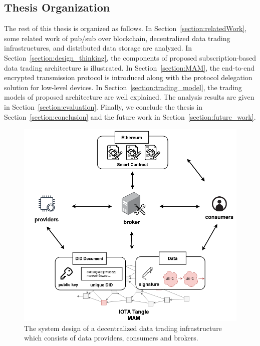 \begin{spacing}{2.0}
\subsection{Thesis Organization}
The rest of this thesis is organized as follows. In Section~\ref{section:relatedWork}, some related work of pub/sub over blockchain, decentralized data trading infrastructures, and distributed data storage are analyzed. In Section~\ref{section:design_thinking}, the components of proposed subscription-based data trading architecture is illustrated. In Section~\ref{section:MAM}, the end-to-end encrypted transmission protocol is introduced along with the protocol delegation solution for low-level devices. In Section~\ref{section:trading_model}, the trading models of proposed architecture are well explained. The analysis results are given in Section~\ref{section:evaluation}. Finally, we conclude the thesis in Section~\ref{section:conclusion} and the future work in Section~\ref{section:future_work}.

\begin{figure}[!t]
    \centering
    \includegraphics[width=5.in]{img/system_design}
    \caption{The system design of a decentralized data trading infrastructure which consists of data providers, consumers and brokers.}
    \label{fig:system_design}
\end{figure}

\end{spacing}

\clearpage
{}

